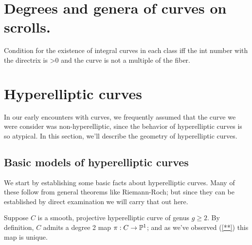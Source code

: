   
\section{Degrees and genera of curves on scrolls.} Condition for the existence of integral curves in each class iff the int number with the directrix is >0 and the curve is not a multiple of the fiber. 


\section{Hyperelliptic curves}

In our early encounters with curves, we frequently assumed that the curve we were consider was non-hyperelliptic, since the behavior of hyperelliptic curves is so atypical. In this section, we'll describe the geometry of hyperelliptic curves.

\subsection{Basic models of hyperelliptic curves}

We start by establishing some basic facts about hyperelliptic curves. Many of these follow from general theorems like Riemann-Roch; but since they can be established by direct examination we will carry that out here.

Suppose $C$ is a smooth, projective hyperelliptic curve of genus $g \geq 2$. By definition, $C$ admits a degree 2 map $\pi : C \to \PP^1$; and as we've observed (\ref{**}) this map is unique.

